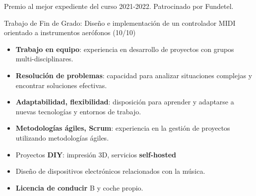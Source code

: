 \documentclass[10pt,a4paper,ragged2e,withhyper]{altacv}
\begin{document}
\begin{paracol}{2}
\faTrophy Premio al mejor expediente del curso 2021-2022. Patrocinado por Fundetel.

\divider


\faGraduationCap Trabajo de Fin de Grado: Diseño e implementación de un controlador MIDI orientado a instrumentos aerófonos (10/10)


\divider
{}


\begin{itemize}
  \setlength{\itemindent}{0.5em}
  \item \textbf{Trabajo en equipo}: experiencia en desarrollo de proyectos con grupos multi-disciplinares.
  \item \textbf{Resolución de problemas}: capacidad para analizar situaciones complejas y encontrar soluciones efectivas.
  \item \textbf{Adaptabilidad, flexibilidad}: disposición para aprender y adaptarse a nuevas tecnologías y entornos de trabajo.
  \item \textbf{Metodologías ágiles, Scrum}: experiencia en la gestión de proyectos utilizando metodologías ágiles.
\end{itemize}

\medskip


\begin{itemize}
  \setlength{\itemindent}{0.5em}
  \item Proyectos \textbf{DIY}: impresión 3D, servicios \textbf{self-hosted}
   \\ 
  \item Diseño de dispositivos electrónicos relacionados con la música.
  \item \textbf{Licencia de conducir} B y coche propio.
\end{itemize}




\end{paracol}
\end{document}
